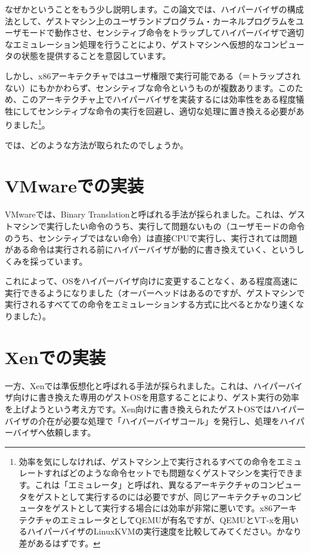 なぜかということをもう少し説明します。この論文では、ハイパーバイザの構成法として、ゲストマシン上のユーザランドプログラム・カーネルプログラムをユーザモードで動作させ、センシティブ命令をトラップしてハイパーバイザで適切なエミュレーション処理を行うことにより、ゲストマシンへ仮想的なコンピュータの状態を提供することを意図しています。

しかし、x86アーキテクチャではユーザ権限で実行可能である（＝トラップされない）にもかかわらず、センシティブな命令というものが複数あります。このため、このアーキテクチャ上でハイパーバイザを実装するには効率性をある程度犠牲にしてセンシティブな命令の実行を回避し、適切な処理に置き換える必要がありました\footnote{効率を気にしなければ、ゲストマシン上で実行されるすべての命令をエミュレートすればどのような命令セットでも問題なくゲストマシンを実行できます。これは「エミュレータ」と呼ばれ、異なるアーキテクチャのコンピュータをゲストとして実行するのには必要ですが、同じアーキテクチャのコンピュータをゲストとして実行する場合には効率が非常に悪いです。x86アーキテクチャのエミュレータとしてQEMUが有名ですが、QEMUとVT-xを用いるハイパーバイザのLinuxKVMの実行速度を比較してみてください。かなり差があるはずです。}。

では、どのような方法が取られたのでしょうか。

\section{VMwareでの実装}
VMwareでは、Binary Translationと呼ばれる手法が採られました。これは、ゲストマシンで実行したい命令のうち、実行して問題ないもの（ユーザモードの命令のうち、センシティブではない命令）は直接CPUで実行し、実行されては問題がある命令は実行される前にハイパーバイザが動的に書き換えていく、というしくみを採っています。

これによって、OSをハイパーバイザ向けに変更することなく、ある程度高速に実行できるようになりました（オーバーヘッドはあるのですが、ゲストマシンで実行されるすべてての命令をエミュレーションする方式に比べるとかなり速くなりました）。

\section{Xenでの実装}
一方、Xenでは準仮想化と呼ばれる手法が採られました。これは、ハイパーバイザ向けに書き換えた専用のゲストOSを用意することにより、ゲスト実行の効率を上げようという考え方です。Xen向けに書き換えられたゲストOSではハイパーバイザの介在が必要な処理で「ハイパーバイザコール」を発行し、処理をハイパーバイザへ依頼します。

